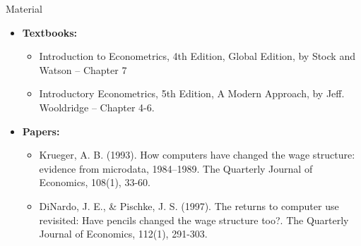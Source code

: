 \documentclass[notes,10pt, aspectratio=169]{beamer}
\begin{document}
\begin{frame}[allowframebreaks]{Material}
\begin{itemize}
    \item[--] \textbf{Textbooks:}
    \begin{itemize}
        \item Introduction to Econometrics, 4th Edition, Global Edition, by Stock and Watson -- Chapter 7
        \item Introductory Econometrics, 5th Edition, A Modern Approach, by Jeff. Wooldridge  -- Chapter 4-6.
    \end{itemize}
    \item[--] \textbf{Papers:}
    \begin{itemize}
        \item Krueger, A. B. (1993). How computers have changed the wage structure: evidence from microdata, 1984–1989. The Quarterly Journal of Economics, 108(1), 33-60.
        \item DiNardo, J. E., \& Pischke, J. S. (1997). The returns to computer use revisited: Have pencils changed the wage structure too?. The Quarterly Journal of Economics, 112(1), 291-303.
    \end{itemize}
\end{itemize}
\scriptsize{

 
}
\end{frame}
\end{document}
